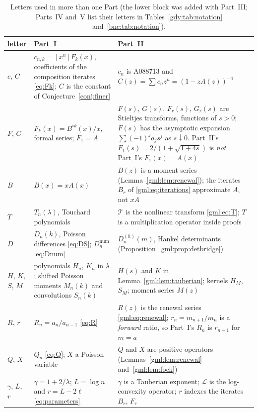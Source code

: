 \documentclass[11pt]{article}
\numberwithin{equation}{section}
\theoremstyle{definition}
\theoremstyle{remark}
\newcommand{\LL}{\mathcal L}
\newcommand{\T}{\mathcal T}
\begin{document}
\begin{table}[p]
\centering\footnotesize
\caption{Letters used in more than one Part (the lower block was added
with Part~III; Parts~IV and~V list their letters in
Tables~\ref{gdy:tab:notation} and~\ref{bnc:tab:notation}).}\label{gml:tab:notation}
\begin{tabular}{@{}l>{\raggedright\arraybackslash}p{}>{\raggedright\arraybackslash}p{}@{}}
\toprule
letter & Part~I & Part~II\\
\midrule
$c$, $C$ & $c_{n,k}=[x^n]F_k(x)$, coefficients of the composition
 iterates \eqref{eq:Fk}; $C$ is the constant of
 Conjecture~\ref{conj:finer}
 & $c_n$ is A088713 and $C(z)=\sum c_nz^n=(1-zA(z))^{-1}$\\
$F$, $G$ & $F_k(x)=B^{\circ k}(x)/x$, formal series; $F_1=A$
 & $F(s)$, $G(s)$, $F_r(s)$, $G_r(s)$ are Stieltjes transforms, functions
 of $s>0$; $F(s)$ has the asymptotic expansion
 $\sum(-1)^ja_js^j$ as $s\downarrow0$. Part~II's
 $F_1(s)=2/(1+\sqrt{1+4s})$ is \emph{not} Part~I's $F_1(x)=A(x)$\\
$B$ & $B(x)=xA(x)$
 & $B(z)$ is a moment series (Lemma~\ref{gml:lem:renewal}); the iterates
 $B_r$ of \eqref{gml:eq:iterations} approximate $A$, not $xA$\\
$T$ & $T_n(\lambda)$, Touchard polynomials
 & $\T$ is the nonlinear transform \eqref{gml:eq:T}; $T$ is a
 multiplication operator inside proofs\\
$D$ & $D_n(k)$, Poisson differences \eqref{eq:DS};
 $D_n^{\mathrm{num}}$ \eqref{eq:Dnum}
 & $D_n^{(h)}(m)$, Hankel determinants (Proposition~\ref{gml:prop:detbridge})\\
$H$, $K$, $S$, $M$ & polynomials $H_n$, $K_n$ in $\lambda$; shifted
 Poisson moments $M_n(k)$ and convolutions $S_n(k)$
 & $H(s)$ and $K$ in Lemma~\ref{gml:lem:tauberian}; kernels $H_M$, $S_M$;
 moment series $M(z)$\\
$R$, $r$ & $R_n=a_n/a_{n-1}$ \eqref{eq:R}
 & $R(z)$ is the renewal series \eqref{gml:eq:renewal};
 $r_n=m_{n+1}/m_n$ is a \emph{forward} ratio, so Part~I's $R_n$ is
 $r_{n-1}$ for $m=a$\\
$Q$, $X$ & $Q_n$ \eqref{eq:Q}; $X$ a Poisson variable
 & $Q$ and $X$ are positive operators (Lemmas~\ref{gml:lem:renewal}
 and~\ref{gml:lem:fock})\\
$\gamma$, $L$, $r$ & $\gamma=1+2/\lambda$; $L=\log n$ and $r=L-2\ell$
 \eqref{eq:parameters}
 & $\gamma$ is a Tauberian exponent; $\LL$ is the log-convexity operator;
 $r$ indexes the iterates $B_r$, $F_r$\\

\end{tabular}
\end{table}
\end{document}
